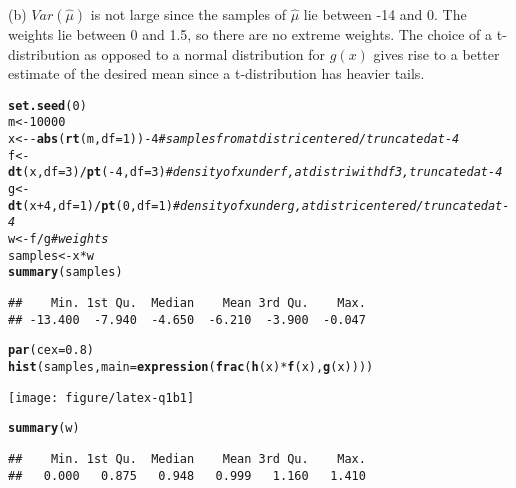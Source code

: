 \documentclass{article}\usepackage[]{graphicx}\usepackage[]{color}
\makeatletter
\def\maxwidth{ %
  \ifdim\Gin@nat@width>\linewidth
    \linewidth
  \else
    \Gin@nat@width
  \fi
}
\newcommand{\hlnum}[1]{\textcolor[rgb]{0.686,0.059,0.569}{#1}}%
\newcommand{\hlcom}[1]{\textcolor[rgb]{0.678,0.584,0.686}{\textit{#1}}}%
\newcommand{\hlopt}[1]{\textcolor[rgb]{0,0,0}{#1}}%
\newcommand{\hlstd}[1]{\textcolor[rgb]{0.345,0.345,0.345}{#1}}%
\newcommand{\hlkwb}[1]{\textcolor[rgb]{0.69,0.353,0.396}{#1}}%
\newcommand{\hlkwc}[1]{\textcolor[rgb]{0.333,0.667,0.333}{#1}}%
\newcommand{\hlkwd}[1]{\textcolor[rgb]{0.737,0.353,0.396}{\textbf{#1}}}%
\newenvironment{kframe}{%
 \def\at@end@of@kframe{}%
 \ifinner\ifhmode%
  \def\at@end@of@kframe{\end{minipage}}%
  \begin{minipage}{\columnwidth}%
 \fi\fi%
 \def\FrameCommand##1{\hskip\@totalleftmargin \hskip-\fboxsep
 \colorbox{shadecolor}{##1}\hskip-\fboxsep
     \hskip-\linewidth \hskip-\@totalleftmargin \hskip\columnwidth}%
 \MakeFramed {\advance\hsize-\width
   \@totalleftmargin\z@ \linewidth\hsize
   \@setminipage}}%
 {\par\unskip\endMakeFramed%
 \at@end@of@kframe}
\newenvironment{knitrout}{}{} %
\makeatother
\begin{document}
(b)
$Var(\hat{\mu})$ is not large since the samples of $\hat{\mu}$ lie between -14 and 0. The weights lie between 0 and 1.5, so there are no extreme weights. The choice of a t-distribution as opposed to a normal distribution for $g(x)$ gives rise to a better estimate of the desired mean since a t-distribution has heavier tails.

\begin{knitrout}
\color{fgcolor}\begin{kframe}
\begin{alltt}
\hlkwd{set.seed}\hlstd{(}\hlnum{0}\hlstd{)}
\hlstd{m} \hlkwb{<-} \hlnum{10000}
\hlstd{x} \hlkwb{<-} \hlopt{-} \hlkwd{abs}\hlstd{(}\hlkwd{rt}\hlstd{(m,} \hlkwc{df} \hlstd{=} \hlnum{1}\hlstd{))} \hlopt{-} \hlnum{4} \hlcom{# samples from a t distri centered/truncated at -4}
\hlstd{f} \hlkwb{<-} \hlkwd{dt}\hlstd{(x,} \hlkwc{df} \hlstd{=} \hlnum{3}\hlstd{)}\hlopt{/}\hlkwd{pt}\hlstd{(}\hlopt{-}\hlnum{4}\hlstd{,} \hlkwc{df} \hlstd{=} \hlnum{3}\hlstd{)} \hlcom{# density of x under f, a t distri with df 3, truncated at -4}
\hlstd{g} \hlkwb{<-} \hlkwd{dt}\hlstd{(x} \hlopt{+} \hlnum{4}\hlstd{,} \hlkwc{df} \hlstd{=} \hlnum{1}\hlstd{)}\hlopt{/}\hlkwd{pt}\hlstd{(}\hlnum{0}\hlstd{,} \hlkwc{df} \hlstd{=} \hlnum{1}\hlstd{)}  \hlcom{# density of x under g, a t distri centered/truncated at -4}
\hlstd{w} \hlkwb{<-} \hlstd{f}\hlopt{/}\hlstd{g} \hlcom{# weights}
\hlstd{samples} \hlkwb{<-} \hlstd{x}\hlopt{*}\hlstd{w}
\hlkwd{summary}\hlstd{(samples)}
\end{alltt}
\begin{verbatim}
##    Min. 1st Qu.  Median    Mean 3rd Qu.    Max. 
## -13.400  -7.940  -4.650  -6.210  -3.900  -0.047
\end{verbatim}
\begin{alltt}
\hlkwd{par}\hlstd{(}\hlkwc{cex} \hlstd{=} \hlnum{0.8}\hlstd{)}
\hlkwd{hist}\hlstd{(samples,} \hlkwc{main} \hlstd{=} \hlkwd{expression}\hlstd{(}\hlkwd{frac}\hlstd{(}\hlkwd{h}\hlstd{(x)}\hlopt{*}\hlkwd{f}\hlstd{(x),} \hlkwd{g}\hlstd{(x))))}
\end{alltt}
\end{kframe}
\texttt{[image: figure/latex-q1b1]} 
\begin{kframe}\begin{alltt}
\hlkwd{summary}\hlstd{(w)}
\end{alltt}
\begin{verbatim}
##    Min. 1st Qu.  Median    Mean 3rd Qu.    Max. 
##   0.000   0.875   0.948   0.999   1.160   1.410

\end{verbatim}
\end{kframe}
\end{knitrout}
\end{document}
